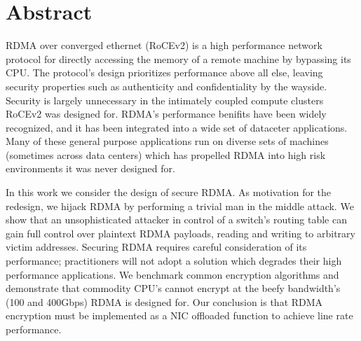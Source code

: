 \section{Abstract}
\label{sec:abstract}

RDMA over converged ethernet (RoCEv2) is a high performance network protocol
for directly accessing the memory of a remote machine by bypassing its CPU.
The protocol's design prioritizes performance above all else, leaving security
properties such as authenticity and confidentiality by the wayside. Security is
largely unnecessary in the intimately coupled compute clusters RoCEv2 was
designed for. RDMA's performance benifits have been widely recognized, and it
has been integrated into a wide set of dataceter applications. Many of these
general purpose applications run on diverse sets of machines (sometimes across
data centers) which has propelled RDMA into high risk environments it was never
designed for.

In this work we consider the design of secure RDMA. As motivation for the redesign,
we hijack RDMA by performing a trivial man in the middle attack. We show that
an unsophisticated attacker in control of a switch's routing table can gain
full control over plaintext RDMA payloads, reading and writing to arbitrary victim addresses.
Securing RDMA requires careful consideration of its performance; practitioners
will not adopt a solution which degrades their high performance applications.
We benchmark common encryption algorithms and demonstrate that commodity CPU's
cannot encrypt at the beefy bandwidth's (100 and 400Gbps) RDMA is designed for.
Our conclusion is that RDMA encryption must be implemented as a NIC offloaded
function to achieve line rate performance.
